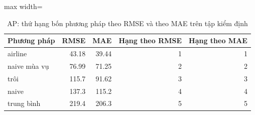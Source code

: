 \begin{table}[H]
\centering\small
\caption{AP: thứ hạng bốn phương pháp theo RMSE và theo MAE trên tập kiểm định}\label{tab:tab_b12_13_ranking}
\begin{adjustbox}{max width=\linewidth}
\begin{tabular}{lrrrr}
\toprule
Phương pháp & RMSE & MAE & Hạng theo RMSE & Hạng theo MAE \\
\midrule
airline & 43.18 & 39.44 & 1 & 1 \\
naive mùa vụ & 76.99 & 71.25 & 2 & 2 \\
trôi & 115.7 & 91.62 & 3 & 3 \\
naive & 137.3 & 115.2 & 4 & 4 \\
trung bình & 219.4 & 206.3 & 5 & 5 \\
\bottomrule
\end{tabular}
\end{adjustbox}
\end{table}
